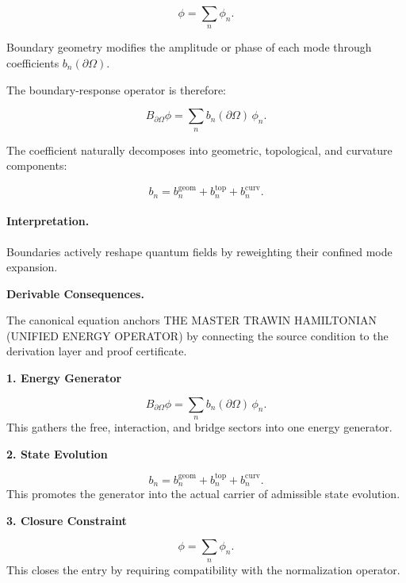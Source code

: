 \begin{equation}
\phi=\sum_n \phi_n .
\end{equation}

Boundary geometry modifies the amplitude or phase of each mode through coefficients $b_n(\partial\Omega)$.

The boundary-response operator is therefore:

\begin{equation}
\boxed{
B_{\partial\Omega}\phi
=
\sum_n b_n(\partial\Omega)\,\phi_n .
}
\end{equation}

The coefficient naturally decomposes into geometric, topological, and curvature components:

\begin{equation}
b_n
=
b_n^{\mathrm{geom}}
+
b_n^{\mathrm{top}}
+
b_n^{\mathrm{curv}} .
\end{equation}

\paragraph{Interpretation.}
Boundaries actively reshape quantum fields by reweighting their confined mode expansion.

\par\vspace{0.35em}
\noindent\textbf{Derivable Consequences.}\quad
\begingroup
\footnotesize
\raggedright
The canonical equation anchors THE MASTER TRAWIN HAMILTONIAN (UNIFIED ENERGY OPERATOR) by connecting the source condition to the derivation layer and proof certificate.
\par\endgroup

\noindent\textbf{1. Energy Generator}\par
\[
B_{\partial\Omega}\phi = \sum_n b_n(\partial\Omega)\,\phi_n.
\]
\noindent This gathers the free, interaction, and bridge sectors into one energy generator.\par
\noindent\textbf{2. State Evolution}\par
\[
b_n = b_n^{\mathrm{geom}} + b_n^{\mathrm{top}} + b_n^{\mathrm{curv}}.
\]
\noindent This promotes the generator into the actual carrier of admissible state evolution.\par
\noindent\textbf{3. Closure Constraint}\par
\[
\phi=\sum_n \phi_n.
\]
\noindent This closes the entry by requiring compatibility with the normalization operator.\par

